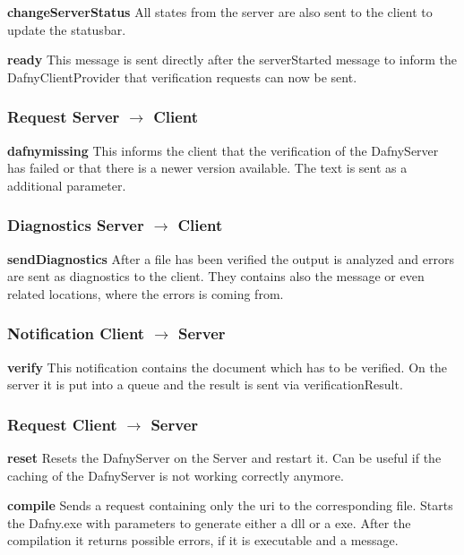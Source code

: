 \textbf{changeServerStatus}
All states from the server are also sent to the client to update the statusbar. \newline

\textbf{ready}
This message is sent directly after the serverStarted message to inform the DafnyClientProvider that verification requests can now be sent. \newline

\subsubsection{Request Server $\longrightarrow$ Client}

\textbf{dafnymissing}
This informs the client that the verification of the DafnyServer has failed or that there is a newer version available. The text is sent as a additional parameter.  \newline

\subsubsection{Diagnostics Server $\longrightarrow$ Client}

\textbf{sendDiagnostics}
After a file has been verified the output is analyzed and errors are sent as diagnostics to the client. They contains also the message or even related locations, where the errors is coming from.  \newline

\subsubsection{Notification Client $\longrightarrow$ Server}

\textbf{verify}
This notification contains the document which has to be verified. On the server it is put into a queue and the result is sent via verificationResult. \newline

\subsubsection{Request Client $\longrightarrow$ Server}

\textbf{reset}
Resets the DafnyServer on the Server and restart it. Can be useful if the caching of the DafnyServer is not working correctly anymore. \newline

\textbf{compile}
Sends a request containing only the uri to the corresponding file. Starts the Dafny.exe with parameters to generate either a dll or a exe. After the compilation it returns possible errors, if it is executable and a message.\newline

